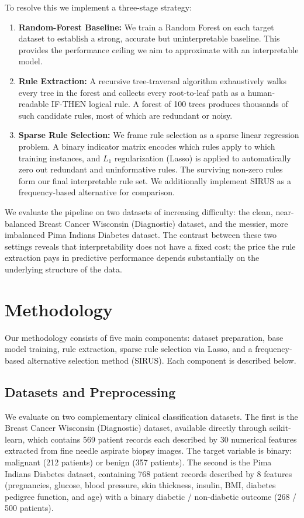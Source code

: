 \documentclass[11pt]{article}
\begin{document}
To resolve this we implement a three-stage strategy:

\begin{enumerate}
\item \textbf{Random-Forest Baseline:} We train a Random Forest on each target dataset to establish a strong, accurate but uninterpretable baseline. This provides the performance ceiling we aim to approximate with an interpretable model.
\item \textbf{Rule Extraction:} A recursive tree-traversal algorithm exhaustively walks every tree in the forest and collects every root-to-leaf path as a human-readable IF-THEN logical rule. A forest of 100 trees produces thousands of such candidate rules, most of which are redundant or noisy.
\item \textbf{Sparse Rule Selection:} We frame rule selection as a sparse linear regression problem. A binary indicator matrix encodes which rules apply to which training instances, and $L_1$ regularization (Lasso) is applied to automatically zero out redundant and uninformative rules. The surviving non-zero rules form our final interpretable rule set. We additionally implement SIRUS \cite{benard2021sirus} as a frequency-based alternative for comparison.
\end{enumerate}

We evaluate the pipeline on two datasets of increasing difficulty: the clean, near-balanced Breast Cancer Wisconsin (Diagnostic) dataset, and the messier, more imbalanced Pima Indians Diabetes dataset. The contrast between these two settings reveals that interpretability does not have a fixed cost; the price the rule extraction pays in predictive performance depends substantially on the underlying structure of the data.

\section{Methodology}

Our methodology consists of five main components: dataset preparation, base model training, rule extraction, sparse rule selection via Lasso, and a frequency-based alternative selection method (SIRUS). Each component is described below.

\subsection{Datasets and Preprocessing}

We evaluate on two complementary clinical classification datasets. The first is the Breast Cancer Wisconsin (Diagnostic) dataset, available directly through scikit-learn, which contains 569 patient records each described by 30 numerical features extracted from fine needle aspirate biopsy images. The target variable is binary: malignant (212 patients) or benign (357 patients). The second is the Pima Indians Diabetes dataset, containing 768 patient records described by 8 features (pregnancies, glucose, blood pressure, skin thickness, insulin, BMI, diabetes pedigree function, and age) with a binary diabetic / non-diabetic outcome (268 / 500 patients).
\end{document}
